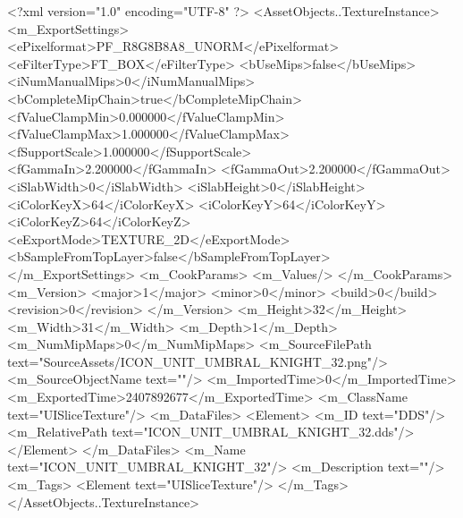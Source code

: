 <?xml version="1.0" encoding="UTF-8" ?>
<AssetObjects..TextureInstance>
	<m_ExportSettings>
		<ePixelformat>PF_R8G8B8A8_UNORM</ePixelformat>
		<eFilterType>FT_BOX</eFilterType>
		<bUseMips>false</bUseMips>
		<iNumManualMips>0</iNumManualMips>
		<bCompleteMipChain>true</bCompleteMipChain>
		<fValueClampMin>0.000000</fValueClampMin>
		<fValueClampMax>1.000000</fValueClampMax>
		<fSupportScale>1.000000</fSupportScale>
		<fGammaIn>2.200000</fGammaIn>
		<fGammaOut>2.200000</fGammaOut>
		<iSlabWidth>0</iSlabWidth>
		<iSlabHeight>0</iSlabHeight>
		<iColorKeyX>64</iColorKeyX>
		<iColorKeyY>64</iColorKeyY>
		<iColorKeyZ>64</iColorKeyZ>
		<eExportMode>TEXTURE_2D</eExportMode>
		<bSampleFromTopLayer>false</bSampleFromTopLayer>
	</m_ExportSettings>
	<m_CookParams>
		<m_Values/>
	</m_CookParams>
	<m_Version>
		<major>1</major>
		<minor>0</minor>
		<build>0</build>
		<revision>0</revision>
	</m_Version>
	<m_Height>32</m_Height>
	<m_Width>31</m_Width>
	<m_Depth>1</m_Depth>
	<m_NumMipMaps>0</m_NumMipMaps>
	<m_SourceFilePath text="SourceAssets/ICON_UNIT_UMBRAL_KNIGHT_32.png"/>
	<m_SourceObjectName text=""/>
	<m_ImportedTime>0</m_ImportedTime>
	<m_ExportedTime>2407892677</m_ExportedTime>
	<m_ClassName text="UISliceTexture"/>
	<m_DataFiles>
		<Element>
			<m_ID text="DDS"/>
			<m_RelativePath text="ICON_UNIT_UMBRAL_KNIGHT_32.dds"/>
		</Element>
	</m_DataFiles>
	<m_Name text="ICON_UNIT_UMBRAL_KNIGHT_32"/>
	<m_Description text=""/>
	<m_Tags>
		<Element text="UISliceTexture"/>
	</m_Tags>
</AssetObjects..TextureInstance>

